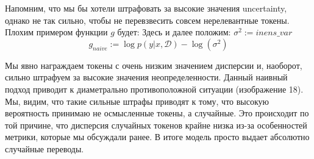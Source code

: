 \documentclass[a4paper,14pt]{extarticle}
\begin{document}
	\begin{figure}[t]
	\end{figure} 
	
	Напомним, что мы бы хотели штрафовать за высокие значения uncertainty, однако не так сильно, чтобы не перевзвесить совсем нерелевантные токены. Плохим примером функции $g$ будет:
	Здесь и далее положим: $\sigma^2 := inens\_var$
	\begin{equation}
		g_{naive} := \log p(y | x, \mathcal{D}) - \log(\sigma^2)
	\end{equation}
	
	Мы явно награждаем токены с очень низким значением дисперсии и, наоборот, сильно штрафуем за высокие значения неопределенности. Данный наивный подход приводит к диаметрально противоположной ситуации (изображение 18). Мы, видим, что такие сильные штрафы приводят к тому, что высокую вероятность принимаю не осмысленные токены, а случайные. Это происходит по той причине, что дисперсия случайных токенов крайне низка из-за особенностей метрики, которые мы обсуждали ранее. В итоге модель просто выдает абсолютно случайные переводы.
	
	\begin{figure}[t]
	\end{figure}
	
\end{document}
